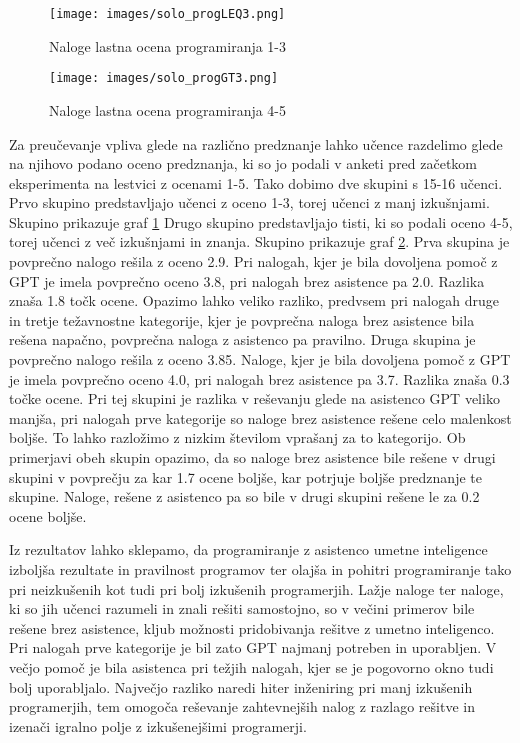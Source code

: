 \documentclass[a4paper,12pt,openright]{book}
\begin{document}
\pagebreak

\begin{figure}[H]
    \centering
    \texttt{[image: images/solo\_progLEQ3.png]}
    \caption{Naloge lastna ocena programiranja 1-3}
    \label{fig:ocenaLTE13}
\end{figure}

\begin{figure}[H]
    \centering
    \texttt{[image: images/solo\_progGT3.png]}
    \caption{Naloge lastna ocena programiranja 4-5}
    \label{fig:ocenaGT3}
\end{figure}

Za preučevanje vpliva glede na različno predznanje lahko učence razdelimo glede na njihovo podano oceno predznanja, ki so jo podali v anketi pred začetkom eksperimenta na lestvici z ocenami 1-5. Tako dobimo dve skupini s 15-16 učenci. Prvo skupino predstavljajo učenci z oceno 1-3, torej učenci z manj izkušnjami. Skupino prikazuje graf \ref{fig:ocenaLTE13} Drugo skupino predstavljajo tisti, ki so podali oceno 4-5, torej učenci z več izkušnjami in znanja. Skupino prikazuje graf \ref{fig:ocenaGT3}.
Prva skupina je povprečno nalogo rešila z oceno 2.9. Pri nalogah, kjer je bila dovoljena pomoč z GPT je imela povprečno oceno 3.8, pri nalogah brez asistence pa 2.0. Razlika znaša 1.8 točk ocene. Opazimo lahko veliko razliko, predvsem pri nalogah druge in tretje težavnostne kategorije, kjer je povprečna naloga brez asistence bila rešena napačno, povprečna naloga z asistenco pa pravilno.
Druga skupina je povprečno nalogo rešila z oceno 3.85. Naloge, kjer je bila dovoljena pomoč z GPT je imela povprečno oceno 4.0, pri nalogah brez asistence pa 3.7. Razlika znaša 0.3 točke ocene. Pri tej skupini je razlika v reševanju glede na asistenco GPT veliko manjša, pri nalogah prve kategorije so naloge brez asistence rešene celo malenkost boljše. To lahko razložimo z nizkim številom vprašanj za to kategorijo.
Ob primerjavi obeh skupin opazimo, da so naloge brez asistence bile rešene v drugi skupini v povprečju za kar 1.7 ocene boljše, kar potrjuje boljše predznanje te skupine. Naloge, rešene z asistenco pa so bile v drugi skupini rešene le za 0.2 ocene boljše.

Iz rezultatov lahko sklepamo, da programiranje z asistenco umetne inteligence izboljša rezultate in pravilnost programov ter olajša in pohitri programiranje tako pri neizkušenih kot tudi pri bolj izkušenih programerjih. Lažje naloge ter naloge, ki so jih učenci razumeli in znali rešiti samostojno, so v večini primerov bile rešene brez asistence, kljub možnosti pridobivanja rešitve z umetno inteligenco. Pri nalogah prve kategorije je bil zato GPT najmanj potreben in uporabljen. V večjo pomoč je bila asistenca pri težjih nalogah, kjer se je pogovorno okno tudi bolj uporabljalo. Največjo razliko naredi hiter inženiring pri manj izkušenih programerjih, tem omogoča reševanje zahtevnejših nalog z razlago rešitve in izenači igralno polje z izkušenejšimi programerji.
\end{document}
